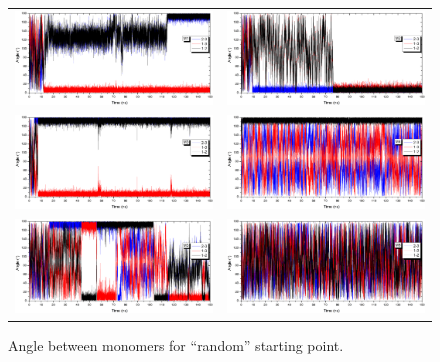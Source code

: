 \begin{figure}[htb]
	\centering
	\begin{tabular}{cc}
		\includegraphics[width=0.45\columnwidth]{image/angle_M1} &
		\includegraphics[width=0.45\columnwidth]{image/angle_M2} \\
		\includegraphics[width=0.45\columnwidth]{image/angle_M3} &
		\includegraphics[width=0.45\columnwidth]{image/angle_M4} \\
		\includegraphics[width=0.45\columnwidth]{image/angle_M5} &
		\includegraphics[width=0.45\columnwidth]{image/angle_M6} \\
	\end{tabular}
	\caption{Angle between monomers for ``random'' starting point.}
	\label{pap:fig14}
\end{figure}

